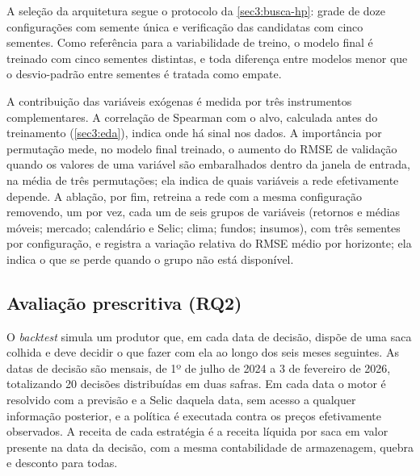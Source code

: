 A seleção da arquitetura segue o protocolo da \autoref{sec3:busca-hp}: grade de doze configurações com semente única e verificação das candidatas com cinco sementes. Como referência para a variabilidade de treino, o modelo final é treinado com cinco sementes distintas, e toda diferença entre modelos menor que o desvio-padrão entre sementes é tratada como empate.

A contribuição das variáveis exógenas é medida por três instrumentos complementares. A correlação de Spearman com o alvo, calculada antes do treinamento (\autoref{sec3:eda}), indica onde há sinal nos dados. A importância por permutação mede, no modelo final treinado, o aumento do RMSE de validação quando os valores de uma variável são embaralhados dentro da janela de entrada, na média de três permutações; ela indica de quais variáveis a rede efetivamente depende. A ablação, por fim, retreina a rede com a mesma configuração removendo, um por vez, cada um de seis grupos de variáveis (retornos e médias móveis; mercado; calendário e Selic; clima; fundos; insumos), com três sementes por configuração, e registra a variação relativa do RMSE médio por horizonte; ela indica o que se perde quando o grupo não está disponível.

\subsection{Avaliação prescritiva (RQ2)}

O \textit{backtest} simula um produtor que, em cada data de decisão, dispõe de uma saca colhida e deve decidir o que fazer com ela ao longo dos seis meses seguintes. As datas de decisão são mensais, de 1º de julho de 2024 a 3 de fevereiro de 2026, totalizando 20 decisões distribuídas em duas safras. Em cada data o motor é resolvido com a previsão e a Selic daquela data, sem acesso a qualquer informação posterior, e a política é executada contra os preços efetivamente observados. A receita de cada estratégia é a receita líquida por saca em valor presente na data da decisão, com a mesma contabilidade de armazenagem, quebra e desconto para todas.

